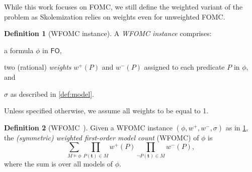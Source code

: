 \documentclass[letterpaper]{article} %
\theoremstyle{remark}
\theoremstyle{definition}
\newtheorem{definition}{Definition}
\newcommand{\FO}{$\mathsf{FO}$}
\begin{document}
While this work focuses on FOMC, we still define the weighted variant of the
problem as Skolemization relies on weights even for unweighted FOMC.

\begin{definition}[WFOMC instance]\label{def:instance}
  A \emph{WFOMC instance} comprises:
  \begin{enumerate*}[label=(\roman*)]
    \item a formula $\phi$ in \FO{},
    \item two (rational) \emph{weights} $w^{+}(P)$ and $w^{-}(P)$ assigned to
    each predicate $P$ in $\phi$, and
    \item $\sigma$ as described in \cref{def:model}.
  \end{enumerate*}
  Unless specified otherwise, we assume all weights to be equal to 1.
\end{definition}

\begin{definition}[WFOMC~\cite{DBLP:conf/ijcai/BroeckTMDR11}]
  Given a WFOMC instance $(\phi, w^{+}, w^{-}, \sigma)$ as in
  \cref{def:instance}, the \emph{(symmetric) weighted first-order model count}
  (WFOMC) of $\phi$ is
  \begin{equation}\label{eq:wfomc}
    \sum_{M \models \phi} \prod_{P(\mathbf{t}) \in M} w^{+}(P) \prod_{\neg P(\mathbf{t}) \in M} w^{-}(P),
  \end{equation}
  where the sum is over all models of $\phi$.
\end{definition}
\end{document}
